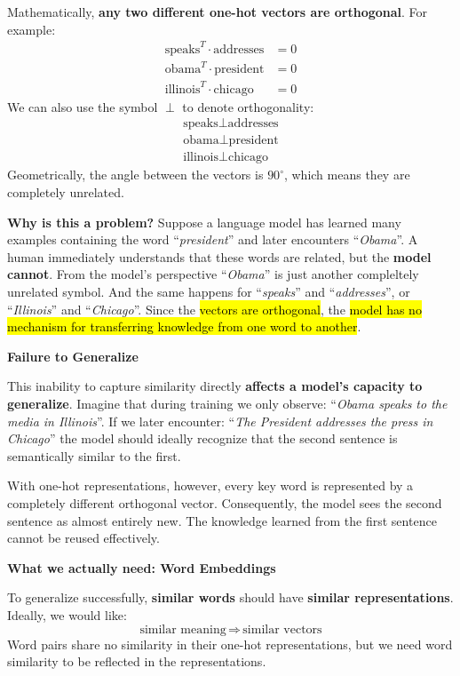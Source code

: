\highspace
Mathematically, \textbf{any two different one-hot vectors are orthogonal}. For example:
\begin{align*}
    \text{speaks}^{T} \cdot \text{addresses} &= 0 \\
    \text{obama}^{T} \cdot \text{president} &= 0 \\
    \text{illinois}^{T} \cdot \text{chicago} &= 0
\end{align*}
We can also use the symbol $\perp$ to denote orthogonality:
\begin{align*}
    \text{speaks} \perp \text{addresses} \\
    \text{obama} \perp \text{president} \\
    \text{illinois} \perp \text{chicago}
\end{align*}
Geometrically, the angle between the vectors is $90^{\circ}$, which means they are completely unrelated.

\highspace
\textcolor{Red2}{ \textbf{Why is this a problem?}} Suppose a language model has learned many examples containing the word ``\emph{president}'' and later encounters ``\emph{Obama}''. A human immediately understands that these words are related, but the \textbf{model cannot}. From the model's perspective ``\emph{Obama}'' is just another compleltely unrelated symbol. And the same happens for ``\emph{speaks}'' and ``\emph{addresses}'', or ``\emph{Illinois}'' and ``\emph{Chicago}''. Since the \hl{vectors are orthogonal}, the \hl{model has no mechanism for transferring knowledge from one word to another}.

\highspace
\begin{flushleft}
    \textcolor{Red2}{ \textbf{Failure to Generalize}}
\end{flushleft}
This inability to capture similarity directly \textbf{affects a model's capacity to generalize}. Imagine that during training we only observe: ``\emph{Obama speaks to the media in Illinois}''. If we later encounter: ``\emph{The President addresses the press in Chicago}'' the model should ideally recognize that the second sentence is semantically similar to the first.

\highspace
With one-hot representations, however, every key word is represented by a completely different orthogonal vector. Consequently, the model sees the second sentence as almost entirely new. The knowledge learned from the first sentence cannot be reused effectively.

\highspace
\begin{flushleft}
    \textcolor{Green3}{ \textbf{What we actually need: Word Embeddings}}
\end{flushleft}
To generalize successfully, \textbf{similar words} should have \textbf{similar representations}. Ideally, we would like:
\begin{equation*}
    \text{similar meaning} \, \Rightarrow \, \text{similar vectors}
\end{equation*}
Word pairs share no similarity in their one-hot representations, but we need word similarity to be reflected in the representations.

